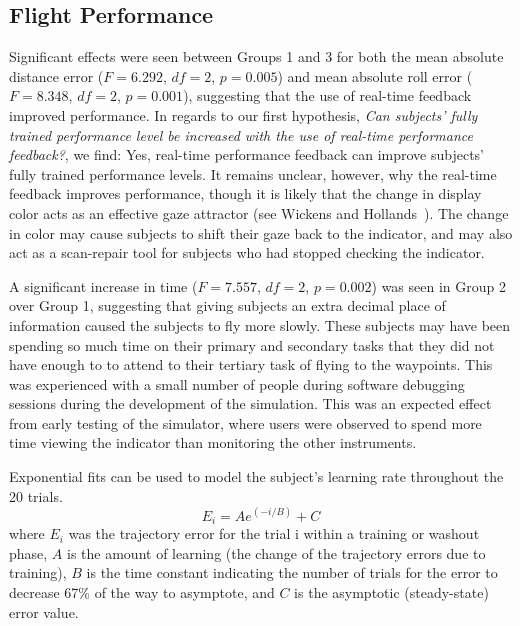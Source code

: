 \documentclass[]{aiaa-tc}%
\begin{document}
\subsection{Flight Performance}
Significant effects were seen between Groups 1 and 3 for both the mean absolute distance error ($F=6.292$, $df = 2$, $p = 0.005$) and mean absolute roll error ($F=8.348$, $df = 2$, $p = 0.001$), suggesting that the use of real-time feedback improved performance. In regards to our first hypothesis, \textit{Can subjects' fully trained performance level be increased with the use of real-time performance feedback?}, we find: Yes, real-time performance feedback can improve subjects' fully trained performance levels. It remains unclear, however, why the real-time feedback improves performance, though it is likely that the change in display color acts as an effective gaze attractor (see Wickens and Hollands~\cite{wickens2015engineering}). The change in color may cause subjects to shift their gaze back to the indicator, and may also act as a scan-repair tool for subjects who had stopped checking the indicator. %

A significant increase in time ($F=7.557$, $df = 2$, $p = 0.002$) was seen in Group 2 over Group 1, suggesting that giving subjects an extra decimal place of information caused the subjects to fly more slowly. These subjects may have been spending so much time on their primary and secondary tasks that they did not have enough to to attend to their tertiary task of flying to the waypoints. This was experienced with a small number of people during software debugging sessions during the development of the simulation. %
This was an expected effect from early testing of the simulator, where users were observed to spend more time viewing the indicator than monitoring the other instruments.

Exponential fits can be used to model the subject's learning rate throughout the 20 trials.\begin{equation}
E_i = A e^{(-i/B)} + C
\label{onlyequation}
\end{equation}
where $E_i$ was the trajectory error for the trial i within a training or washout phase, $A$ is the amount of learning (the change of the trajectory errors due to training), $B$ is the time constant indicating the number of trials for the error to decrease 67\% of the way to asymptote, and $C$ is the asymptotic (steady-state) error value.
\end{document}
